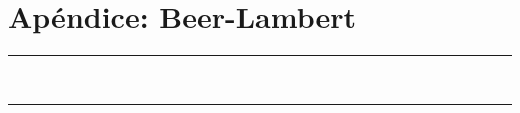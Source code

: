 \pagestyle{plain}
\chapter{Apéndice: Beer-Lambert}\label{app:BeerLambert}
\vspace{0.2cm}
\rule{\linewidth}{1.5pt}\\
\startcontents[chapters]
\vspace{0.2cm}
\rule{\linewidth}{1.5pt}\\
\newpage